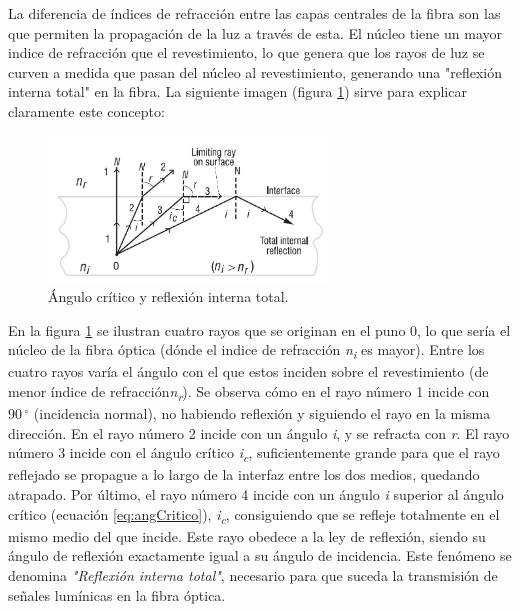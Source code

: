  La diferencia de índices de refracción entre las capas centrales de la fibra son las que permiten la propagación de la luz a través de esta. El núcleo tiene un mayor indice de refracción que el revestimiento, lo que genera que los rayos de luz se curven a medida que pasan del núcleo al revestimiento, generando una "reflexión interna total" en la fibra. La siguiente imagen (figura \ref{fig:TIR}) sirve para explicar claramente este concepto:
 
 \begin{figure}[H]
 	\centering
 	\includegraphics[width=0.66\textwidth]{./img/TIR}
 	\caption{Ángulo crítico y reflexión interna total. \cite{geometriaBasicaFP} } 
 	\label{fig:TIR}
 \end{figure}
 
 En la figura \ref{fig:TIR} se ilustran cuatro rayos que se originan en el puno 0, lo que sería el núcleo de la fibra óptica (dónde el indice de refracción \textit{n\textsubscript{i}} es mayor). Entre los cuatro rayos varía el ángulo con el que estos inciden sobre el revestimiento (de menor índice de refracción\textit{n\textsubscript{r}}). Se observa cómo en el rayo número 1 incide con $90\,^{\circ}$ (incidencia normal), no habiendo reflexión y siguiendo el rayo en la misma dirección. En el rayo número 2 incide con un ángulo \textit{i}, y se refracta con \textit{r}. El rayo número 3 incide con el ángulo crítico \textit{i\textsubscript{c}}, suficientemente grande para que el rayo reflejado se propague a lo largo de la interfaz entre los dos medios, quedando atrapado. Por último, el rayo número 4 incide con un ángulo \textit{i} superior al ángulo crítico (ecuación \ref{eq:angCritico}), \textit{i\textsubscript{c}}, consiguiendo que se refleje totalmente en el mismo medio del que incide. Este rayo obedece a la ley de reflexión, siendo su ángulo de reflexión exactamente igual a su ángulo de incidencia. Este fenómeno se denomina \textit{"Reflexión interna total"}, necesario para que suceda la transmisión de señales lumínicas en la fibra óptica. 

